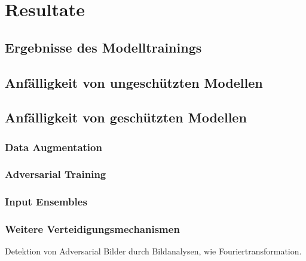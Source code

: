 \section{Resultate}


\subsection{Ergebnisse des Modelltrainings}

\subsection{Anfälligkeit von ungeschützten Modellen}

\subsection{Anfälligkeit von geschützten Modellen}

\subsubsection{Data Augmentation}

\subsubsection{Adversarial Training}

\subsubsection{Input Ensembles}

\subsubsection{Weitere Verteidigungsmechanismen}

Detektion von Adversarial Bilder durch Bildanalysen, wie Fouriertransformation. 

\cite{reiff_understand_2022}